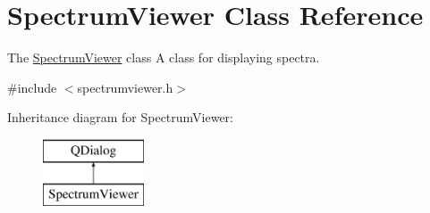 \hypertarget{class_spectrum_viewer}{}\section{Spectrum\+Viewer Class Reference}
\label{class_spectrum_viewer}


The \hyperlink{class_spectrum_viewer}{Spectrum\+Viewer} class A class for displaying spectra.  




{\ttfamily \#include $<$spectrumviewer.\+h$>$}

Inheritance diagram for Spectrum\+Viewer\+:\begin{figure}[H]
\begin{center}
\leavevmode
\includegraphics[height=2.000000cm]{class_spectrum_viewer}
\end{center}
\end{figure}
